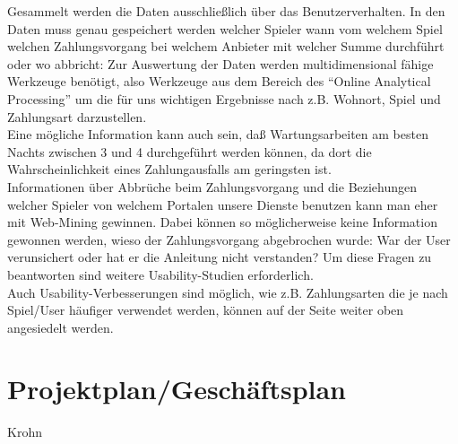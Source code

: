 \documentclass[a4paper,10pt]{article}
\begin{document}
Gesammelt werden die Daten ausschließlich über das Benutzerverhalten.
In den Daten muss genau gespeichert werden welcher Spieler wann vom welchem Spiel welchen Zahlungsvorgang bei welchem Anbieter mit welcher Summe durchführt oder wo abbricht:
Zur Auswertung der Daten werden multidimensional fähige Werkzeuge benötigt, also Werkzeuge aus dem Bereich des "`Online Analytical Processing"' um die für uns wichtigen Ergebnisse
nach z.B. Wohnort, Spiel und Zahlungsart darzustellen.\\
Eine mögliche Information kann auch sein, daß Wartungsarbeiten am besten Nachts zwischen 3 und 4 durchgeführt werden können, da dort die Wahrscheinlichkeit eines Zahlungausfalls am geringsten ist.\\
Informationen über Abbrüche beim Zahlungsvorgang und die Beziehungen welcher Spieler von welchem Portalen unsere Dienste benutzen kann man eher mit Web-Mining gewinnen.
Dabei können so möglicherweise keine Information gewonnen werden, wieso der Zahlungsvorgang abgebrochen wurde: War der User verunsichert oder hat er die Anleitung nicht verstanden?
Um diese Fragen zu beantworten sind weitere Usability-Studien erforderlich.\\
Auch Usability-Verbesserungen sind möglich, wie z.B. Zahlungsarten die je nach Spiel/User häufiger verwendet werden, können auf der Seite weiter oben angesiedelt werden.

\section{Projektplan/Geschäftsplan}\label{labelGeschaeftsplan}
Krohn



\end{document}
